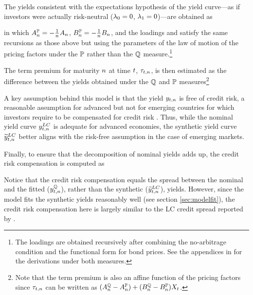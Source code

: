 {The yields consistent with the expectations hypothesis of the yield curve---as if investors were actually risk-neutral (\(\lambda_{0} = 0\), \(\lambda_{1} = 0 \))---are obtained as
	
\noindent in which \(A_{n}^{\mathbb{P}} = - \frac{1}{n} A_{n}\), \(B_{n}^{\mathbb{P}} = - \frac{1}{n} B_{n}\), and the loadings  \!and  \!satisfy the same recursions as those above but using the parameters of the law of motion of the pricing factors under the \(\mathbb{P}\) rather than the \(\mathbb{Q}\) measure.\footnote{ The loadings are obtained recursively after combining the no-arbitrage condition and the functional form for bond prices. See the appendices in \cite{Lloyd:2020} for the derivations under both measures.} %

The term premium for maturity \(n\) at time \(t\), \(\tau_{t,n}\), is then estimated as the difference between the yields obtained under the \(\mathbb{Q}\) and \(\mathbb{P}\) measures\footnote{ Note that the term premium is also an affine function of the pricing factors since \(\tau_{t,n}\) can be written as \((A_{n}^{\mathbb{Q}} - A_{n}^{\mathbb{P}}) + (B_{n}^{\mathbb{Q}}  - B_{n}^{\mathbb{P}}) X_{t} \).}
	
A key assumption behind this model is that the yield \(y_{t,n}\) is free of credit risk, a reasonable assumption for advanced but not for emerging countries for which investors require to be compensated for credit risk \citep{DuSchreger:2016JoF,DuSchreger:2017WP}. 
Thus, %
while the nominal yield curve \(y_{t,n} ^{LC}\) is adequate for advanced economies, %
the synthetic yield curve \(\widetilde{y}_{t,n} ^{LC}\) better aligns with the risk-free assumption %
in the case of emerging markets.

Finally, to ensure that the decomposition of nominal yields adds up, %
the credit risk compensation is computed as
	
\noindent Notice that the credit risk compensation equals the spread between the nominal %
and the fitted (\(y_{t,n}^{\mathbb{Q}}\)), rather than the synthetic (\(\widetilde{y}_{t,n} ^{LC}\)), yields. However, since the model fits the synthetic yields reasonably well (see section \ref{sec:modelfit}), the credit risk compensation here is largely similar to the LC credit spread reported by \cite{DuSchreger:2016JoF}.

}
